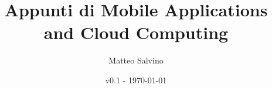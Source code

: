 \documentclass[12pt]{report}
\title{Appunti di Mobile Applications and Cloud Computing}
\author{Matteo Salvino}
\date{v0.1 - \today}
\begin{document}
\maketitle
\tableofcontents
\pagebreak








\begin{appendix}
    
\end{appendix}
\end{document}
